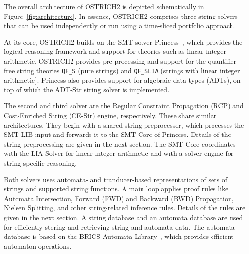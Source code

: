 
The overall architecture of OSTRICH2 is depicted schematically in Figure~\ref{fig:architecture}.
In essence, OSTRICH2 comprises three string solvers that can be used independently or run using a time-sliced portfolio approach.

At its core, OSTRICH2 builds on the SMT solver Princess~\cite{princess}, which provides the logical reasoning framework and support for theories such as linear integer arithmetic.
OSTRICH2 provides pre-processing and support for the quantifier-free string theories \verb+QF_S+ (pure strings) and \verb+QF_SLIA+ (strings with linear integer arithmetic).
Princess also provides support for algebraic data-types (ADTs), on top
of which the ADT-Str string solver is implemented.

The second and third solver are the Regular Constraint Propagation
(RCP) and Cost-Enriched String (CE-Str) engine, respectively.
These share similar architectures.
They begin with a shared string preprocessor, which processes the SMT-LIB input and forwards it to the SMT Core of Princess.
Details of the string preprocessing are given in the next section.
The SMT Core coordinates with the LIA Solver for linear integer arithmetic and with a solver engine for string-specific reasoning.

Both solvers uses automata- and tranducer-based representations of sets of strings and supported string functions.
A main loop applies proof rules like Automata Intersection, Forward (FWD) and Backward (BWD) Propagation, Nielsen Splitting, and other string-related inference rules.
Details of the rules are given in the next section.
A string database and an automata database are used for efficiently storing and retrieving string and automata data.
The automata database is based on the BRICS Automata Library~\cite{brics}, which provides efficient automaton operations.

